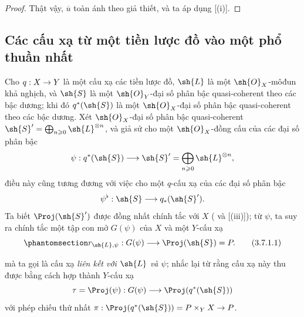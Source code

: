 \documentclass[oneside,10pt]{amsart}
\makeatletter
\renewcommand{\geq}{\geqslant}
\newcommand{\ega@arrow}[2]{\mathchoice{#1}{#2}{#2}{#2}}
\renewcommand{\to}{\ega@arrow{\longrightarrow}{\rightarrow}}
\newcommand{\oldpage}[2][]{\marginnote{\normalfont\footnotesize\textbf{#1}~|~#2}\ignorespaces}
\let\EGAOriginalLabel\label
\renewcommand{\label}[1]{\phantomsection\EGAOriginalLabel{#1}}
\makeatother
\begin{document}
\begin{proof}
Thật vậy, $\overline{u}$ toàn ánh theo giả thiết, và ta áp dụng [(i)].
\end{proof}

\subsection{Các cấu xạ từ một tiền lược đồ vào một phổ thuần nhất}
\label{subsection:II.3.7}

\begin{env}[3.7.1]
\label{II.3.7.1}
Cho $q:X\to Y$ là một cấu xạ các tiền lược đồ, $\sh{L}$ là một $\sh{O}_X$-môđun khả nghịch, và $\sh{S}$ là một $\sh{O}_Y$-đại số phân bậc quasi-coherent theo các bậc dương;
khi đó $q^*(\sh{S})$ là một $\sh{O}_X$-đại số phân bậc quasi-coherent theo các bậc dương.
Xét $\sh{O}_X$-đại số phân bậc quasi-coherent $\sh{S}'=\bigoplus_{n\geq0}\sh{L}^{\otimes n}$, và giả sử cho một $\sh{O}_X$-đồng cấu của các đại số phân bậc
\[
  \psi:q^*(\sh{S})\longrightarrow
  \sh{S}'=\bigoplus_{n\geq0}\sh{L}^{\otimes n},
\]
điều này cũng tương đương với việc cho một $q$-cấu xạ của các đại số phân bậc
\[
  \psi^\flat:\sh{S}\longrightarrow q_*(\sh{S}').
\]
Ta biết $\Proj(\sh{S}')$ được đồng nhất chính tắc với $X$ ( và [(iii)]);
từ $\psi$, ta suy ra chính tắc một tập con mở $G(\psi)$ của $X$ và một $Y$-cấu xạ
\[
\label{II.3.7.1.1}
  r_{\sh{L},\psi}:G(\psi)\longrightarrow \Proj(\sh{S})=P.
\tag{3.7.1.1}
\]
\oldpage[II]{66}

mà ta gọi là cấu xạ \emph{liên kết với $\sh{L}$ và $\psi$};
nhắc lại từ  rằng cấu xạ này thu được bằng cách hợp thành $Y$-cấu xạ
\[
  \tau=\Proj(\psi):G(\psi)\longrightarrow\Proj(q^*(\sh{S}))
\]
với phép chiếu thứ nhất $\pi:\Proj(q^*(\sh{S}))=P\times_YX\to P$.
\end{env}
\end{document}
